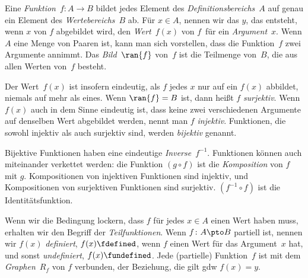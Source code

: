 Eine \emph{Funktion}~$f\colon A \to B$ bildet jedes Element des
\emph{Definitionsbereichs}~$A$ auf genau ein Element des \emph{Wertebereichs}~$B$ ab. Für
$x \in A$, nennen wir das $y$, das entsteht, wenn $x$ von $f$ abgebildet wird, den
\emph{Wert}~$f(x)$ von $f$~für ein \emph{Argument}~$x$. Wenn $A$ eine Menge von
Paaren ist, kann man sich vorstellen, dass die Funktion~$f$ zwei Argumente annimmt. Das
\emph{Bild}~$\ran{f}$ von~$f$ ist die Teilmenge von~$B$, die aus
allen Werten von~$f$ besteht.

Der Wert~$f(x)$ ist insofern eindeutig, als $f$ jedes $x$ nur auf ein $f(x)$ abbildet,
niemals auf mehr als eines. Wenn $\ran{f} = B$ ist, dann heißt $f$ \emph{surjektiv}.
Wenn $f(x)$ auch in dem Sinne eindeutig ist, dass keine zwei verschiedenen Argumente
auf denselben Wert abgebildet werden, nennt man $f$ \emph{injektiv}. Funktionen,
die sowohl injektiv als auch surjektiv sind, werden \emph{bijektiv} genannt.

Bijektive Funktionen haben eine eindeutige \emph{Inverse}~$f^{-1}$.
Funktionen können auch miteinander verkettet werden: die Funktion $(g \circ f)$ ist
die \emph{Komposition} von $f$ mit $g$. Kompositionen von injektiven
Funktionen sind injektiv, und Kompositionen von surjektiven Funktionen sind surjektiv. 
$(f^{-1} \circ f)$ ist die Identitätsfunktion.

Wenn wir die Bedingung lockern, dass $f$ für jedes $x \in A$ einen Wert haben muss,
erhalten wir den Begriff der \emph{Teilfunktionen}. Wenn $f\colon
A \pto B$ partiell ist, nennen wir $f(x)$ \emph{definiert},
$f(x) \fdefined$, wenn $f$ einen Wert für das Argument~$x$ hat, und sonst \emph{undefiniert}, $f(x) \fundefined$.
Jede (partielle)
Funktion~$f$ ist mit dem \emph{Graphen}~$R_f$ von $f$ verbunden, der
Beziehung, die gilt gdw $f(x) = y$.
